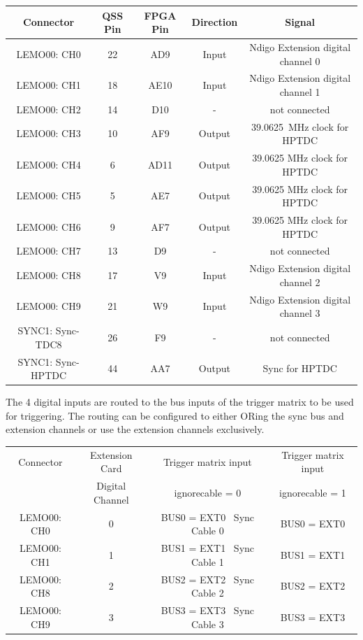 	\begin{small}
	\begin{center}
		\begin{tabular}{|c|c|c|c|c|}
			\hline
			Connector & QSS Pin & FPGA Pin & Direction & Signal\\
			\hline\hline
			LEMO00: CH0 & 22 & AD9 & Input & Ndigo Extension digital channel 0\\\hline
			LEMO00: CH1 & 18 & AE10 & Input & Ndigo Extension digital channel 1\\\hline
			LEMO00: CH2 & 14 & D10 & - & not connected\\\hline
			LEMO00: CH3 & 10 & AF9 & Output & \SI{39.0625}{\mega\hertz} clock for HPTDC\\\hline
			LEMO00: CH4 & 6 & AD11 & Output & 39.0625 MHz clock for HPTDC\\\hline
			LEMO00: CH5 & 5 & AE7 & Output & 39.0625 MHz clock for HPTDC\\\hline
			LEMO00: CH6 & 9 & AF7 & Output & 39.0625 MHz clock for HPTDC\\\hline
			LEMO00: CH7 & 13 & D9 & - & not connected\\\hline
			LEMO00: CH8 & 17 & V9 & Input & Ndigo Extension digital channel 2\\\hline
			LEMO00: CH9 & 21 & W9 & Input & Ndigo Extension digital channel 3\\\hline
			SYNC1: Sync-TDC8 & 26 & F9 & - & not connected\\\hline
			SYNC1: Sync-HPTDC & 44 & AA7 & Output & Sync for HPTDC\\\hline
		\end{tabular}
	\end{center}
	\end{small}
	
	The 4 digital inputs are routed to the bus inputs of the trigger matrix to be used for triggering. The routing can be configured to either ORing the sync bus and extension channels or use the extension channels exclusively.

	\begin{center}
		\begin{tabular}{|c|c|c|c|}
			\hline
			Connector & Extension Card & Trigger matrix input  & Trigger matrix input\\
			& Digital Channel & ignore\tu cable = 0 & ignore\tu cable = 1\\
			\hline\hline
			LEMO00: CH0 & 0 & BUS0 = EXT0 \textbar\ Sync Cable 0 & BUS0 = EXT0\\\hline
			LEMO00: CH1 & 1 & BUS1 = EXT1 \textbar\ Sync Cable 1 & BUS1 = EXT1\\\hline
			LEMO00: CH8 & 2 & BUS2 = EXT2 \textbar\ Sync Cable 2 & BUS2 = EXT2\\\hline
			LEMO00: CH9 & 3 & BUS3 = EXT3 \textbar\ Sync Cable 3 & BUS3 = EXT3\\\hline
		\end{tabular}
	\end{center}

